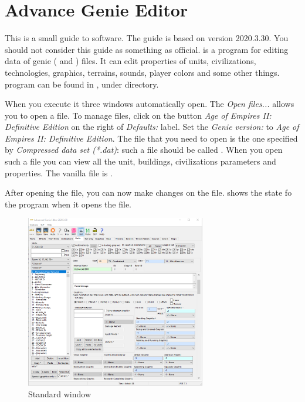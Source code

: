 \chapter{Advance Genie Editor}
    \label{chp:genieeditor}

    This is a small guide to \genie{} software. The guide is based on version 2020.3.30. You should not consider this guide as something as official. \genie{} is a program for editing data of genie ( and ) files. It can edit properties of units, civilizations, technologies, graphics, terrains, sounds, player colors and some other things\cite{TurnupHyperion4:2019}.
    \genie{} program can be found in \aoeexedir{}, under  directory.

    When you execute it three windows automatically open. The \textit{Open files...} allows you to open a \genie{} file. To manage \aoe{} files, click on the button \textit{Age of Empires II: Definitive Edition} on the right of \textit{Defaults:} label. Set the \textit{Genie version:} to \textit{Age of Empires II: Definitive Edition}.
    The file that you need to open is the one specified by \textit{Compressed data set (*.dat)}: such a file should be called . When you open such a file you can view all the unit, buildings, civilizations parameters and properties. The vanilla file is .

    After opening the file, you can now make changes on the file.  shows the state fo the program when it opens the file. 

    \begin{figure}[ht]
        \centering
        \includegraphics[width=0.7\textwidth]{src/images/genie01}
        \caption{Standard \genie{} window}
        \label{fig:genie01}
    \end{figure}

